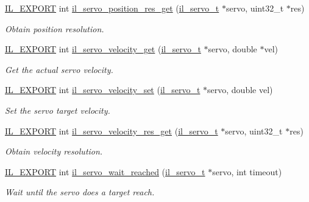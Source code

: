 \begin{DoxyCompactItemize}
\hyperlink{common_8h_a6bb629d26c52bfe10519ba3176853f47}{I\+L\+\_\+\+E\+X\+P\+O\+RT} int \hyperlink{group__IL__SERVO_ga34382a1fd3a11ae5f64e20399ee85356}{il\+\_\+servo\+\_\+position\+\_\+res\+\_\+get} (\hyperlink{group__IL__SERVO_ga3369ddfcc33492fe3a28f96cf455b13e}{il\+\_\+servo\+\_\+t} $\ast$servo, uint32\+\_\+t $\ast$res)
\begin{DoxyCompactList}\small\item\em Obtain position resolution. \end{DoxyCompactList}\item 
\hyperlink{common_8h_a6bb629d26c52bfe10519ba3176853f47}{I\+L\+\_\+\+E\+X\+P\+O\+RT} int \hyperlink{group__IL__SERVO_ga466d1762b8c9d773ce2b3697a44b3d0a}{il\+\_\+servo\+\_\+velocity\+\_\+get} (\hyperlink{group__IL__SERVO_ga3369ddfcc33492fe3a28f96cf455b13e}{il\+\_\+servo\+\_\+t} $\ast$servo, double $\ast$vel)
\begin{DoxyCompactList}\small\item\em Get the actual servo velocity. \end{DoxyCompactList}\item 
\hyperlink{common_8h_a6bb629d26c52bfe10519ba3176853f47}{I\+L\+\_\+\+E\+X\+P\+O\+RT} int \hyperlink{group__IL__SERVO_ga8831402af125c7706353d0dc9bf1364c}{il\+\_\+servo\+\_\+velocity\+\_\+set} (\hyperlink{group__IL__SERVO_ga3369ddfcc33492fe3a28f96cf455b13e}{il\+\_\+servo\+\_\+t} $\ast$servo, double vel)
\begin{DoxyCompactList}\small\item\em Set the servo target velocity. \end{DoxyCompactList}\item 
\hyperlink{common_8h_a6bb629d26c52bfe10519ba3176853f47}{I\+L\+\_\+\+E\+X\+P\+O\+RT} int \hyperlink{group__IL__SERVO_gac23b38d71bf5e26a1d5c275f9e711c47}{il\+\_\+servo\+\_\+velocity\+\_\+res\+\_\+get} (\hyperlink{group__IL__SERVO_ga3369ddfcc33492fe3a28f96cf455b13e}{il\+\_\+servo\+\_\+t} $\ast$servo, uint32\+\_\+t $\ast$res)
\begin{DoxyCompactList}\small\item\em Obtain velocity resolution. \end{DoxyCompactList}\item 
\hyperlink{common_8h_a6bb629d26c52bfe10519ba3176853f47}{I\+L\+\_\+\+E\+X\+P\+O\+RT} int \hyperlink{group__IL__SERVO_gaa18949ceef486037483614569e22197f}{il\+\_\+servo\+\_\+wait\+\_\+reached} (\hyperlink{group__IL__SERVO_ga3369ddfcc33492fe3a28f96cf455b13e}{il\+\_\+servo\+\_\+t} $\ast$servo, int timeout)
\begin{DoxyCompactList}\small\item\em Wait until the servo does a target reach. \end{DoxyCompactList}\item 

\end{DoxyCompactItemize}
